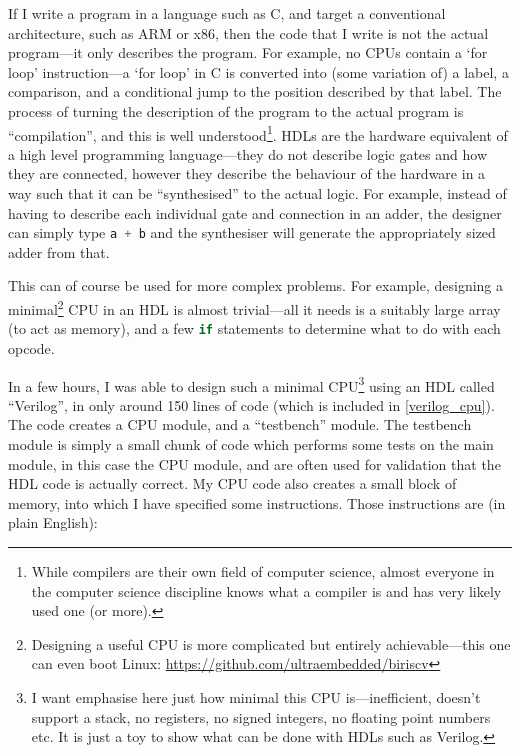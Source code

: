 \documentclass[12pt]{article}
\begin{document}
If I write a program in a language such as C, and target a conventional architecture, such as ARM or x86, then the code that I write is not the actual program---it only describes the program. For example, no CPUs contain a `for loop' instruction---a `for loop' in C is converted into (some variation of) a label, a comparison, and a conditional jump to the position described by that label. The process of turning the description of the program to the actual program is ``compilation'', and this is well understood\footnote{While compilers are their own field of computer science, almost everyone in the computer science discipline knows what a compiler is and has very likely used one (or more).}.
HDLs are the hardware equivalent of a high level programming language---they do not describe logic gates and how they are connected, however they describe the behaviour of the hardware in a way such that it can be ``synthesised'' to the actual logic. For example, instead of having to describe each individual gate and connection in an adder, the designer can simply type \lstinline[language=Verilog]|a + b| and the synthesiser will generate the appropriately sized adder from that.

This can of course be used for more complex problems. For example, designing a minimal\footnote{Designing a useful CPU is more complicated but entirely achievable---this one can even boot Linux: \url{https://github.com/ultraembedded/biriscv}} CPU in an HDL is almost trivial---all it needs is a suitably large array (to act as memory), and a few \lstinline[language=Verilog]|if| statements to determine what to do with each opcode.

In a few hours, I was able to design such a minimal CPU\footnote{I want emphasise here just how minimal this CPU is---inefficient, doesn't support a stack, no registers, no signed integers, no floating point numbers etc. It is just a toy to show what can be done with HDLs such as Verilog.} using an HDL called ``Verilog'', in only around 150 lines of code (which is included in \ref{verilog_cpu}). The code creates a CPU module, and a ``testbench'' module. The testbench module is simply a small chunk of code which performs some tests on the main module, in this case the CPU module, and are often used for validation that the HDL code is actually correct. My CPU code also creates a small block of memory, into which I have specified some instructions. Those instructions are (in plain English):
\end{document}
